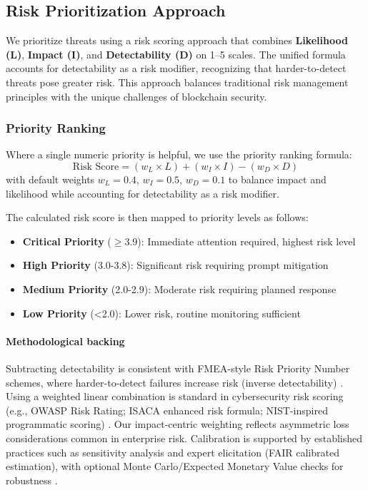 \subsection{Risk Prioritization Approach}
\label{sec:risk_quantification}

We prioritize threats using a risk scoring approach that combines \textbf{Likelihood (L)}, \textbf{Impact (I)}, and \textbf{Detectability (D)} on 1--5 scales. The unified formula accounts for detectability as a risk modifier, recognizing that harder-to-detect threats pose greater risk. This approach balances traditional risk management principles with the unique challenges of blockchain security.

\subsubsection{Priority Ranking}
Where a single numeric priority is helpful, we use the priority ranking formula:
\begin{equation}
    \text{Risk Score} = (w_L \times L) + (w_I \times I) - (w_D \times D)
\end{equation}
with default weights $w_L=0.4$, $w_I=0.5$, $w_D=0.1$ to balance impact and likelihood while accounting for detectability as a risk modifier.

The calculated risk score is then mapped to priority levels as follows:
\begin{itemize}
    \item \textbf{Critical Priority} ($\geq$3.9): Immediate attention required, highest risk level
    \item \textbf{High Priority} (3.0-3.8): Significant risk requiring prompt mitigation
    \item \textbf{Medium Priority} (2.0-2.9): Moderate risk requiring planned response
    \item \textbf{Low Priority} (<2.0): Lower risk, routine monitoring sufficient
\end{itemize}

\paragraph{Methodological backing} Subtracting detectability is consistent with FMEA-style Risk Priority Number schemes, where harder-to-detect failures increase risk (inverse detectability) \cite{WestgardDetectability,PQRI2015FMEA}. Using a weighted linear combination is standard in cybersecurity risk scoring (e.g., OWASP Risk Rating; ISACA enhanced risk formula; NIST-inspired programmatic scoring) \cite{OWASPRiskRating,ISACA2014EnhancedRisk,ZengRCNIST}. Our impact-centric weighting reflects asymmetric loss considerations common in enterprise risk. Calibration is supported by established practices such as sensitivity analysis and expert elicitation (FAIR calibrated estimation), with optional Monte Carlo/Expected Monetary Value checks for robustness \cite{FAIRCalibratedEstimation,RosemetQRA}.

